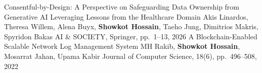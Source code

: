 \begin{cvlist}
\cvpub[AI \& Society 2026]{[J2]}
    {Consentful-by-Design: A Perspective on Safeguarding Data Ownership from Generative AI Leveraging Lessons from the Healthcare Domain}
    {Akis Linardos, Theresa Willem, Alena Buyx, \textbf{Showkot Hossain}, Taeho Jung, Dimitrios Makris, Spyridon Bakas}
    {AI \& SOCIETY, Springer, pp.\ 1--13, 2026}
    {A Blockchain-Enabled Scalable Network Log Management System}
    {MH Rakib, \textbf{Showkot Hossain}, Mosarrat Jahan, Upama Kabir}
    {Journal of Computer Science, 18(6), pp.\ 496--508, 2022}
\end{cvlist}
